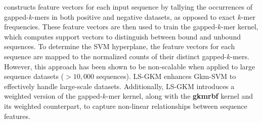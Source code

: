 \documentclass[a4paper, titlepage, openright]{book}
\begin{document}
constructs feature vectors for each input sequence by tallying the occurrences of gapped-$k$-mers in both positive and negative datasets, as opposed to exact $k$-mer frequencies. These feature vectors are then used to train the gapped-$k$-mer kernel, which computes support vectors to distinguish between bound and unbound sequences. To determine the SVM hyperplane, the feature vectors for each sequence are mapped to the normalized counts of their distinct gapped-$k$-mers. However, this approach has been shown to be non-scalable when applied to large sequence datasets ($> 10,000$ sequences). LS-GKM \citep{lee2016ls} enhances Gkm-SVM to effectively handle large-scale datasets. Additionally, LS-GKM introduces a weighted version of the gapped-$k$-mer kernel, along with the \textbf{gkmrbf} kernel and its weighted counterpart, to capture non-linear relationships between sequence features.

\end{document}
